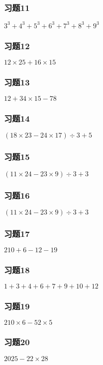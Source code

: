 \begin{frame}
    \frametitle{习题11}
    \centering\textit{\Large $3^3 + 4^3 + 5^3 + 6^3 + 7^3 + 8^3 + 9^3$}
\end{frame}

\begin{frame}
    \frametitle{习题12}
    \centering\textit{\Large $12\times 25 + 16\times 15$}
\end{frame}

\begin{frame}
    \frametitle{习题13}
    \centering\textit{\Large $12 + 34\times 15 -78$}
\end{frame}

\begin{frame}
    \frametitle{习题14}
    \centering\textit{\Large $(18\times 23 - 24\times 17)\div 3 + 5$}
\end{frame}

\begin{frame}
    \frametitle{习题15}
    \centering\textit{\Large $(11\times 24 - 23\times 9)\div 3 + 3$}
\end{frame}

\begin{frame}
    \frametitle{习题16}
    \centering\textit{\Large $(11\times 24 - 23\times 9)\div 3 + 3$}
\end{frame}

\begin{frame}
    \frametitle{习题17}
    \centering\textit{\Large $210 + 6-12 - 19$}
\end{frame}

\begin{frame}
    \frametitle{习题18}
    \centering\textit{\Large $1+3+4+6+7+9+10 + 12$}
\end{frame}

\begin{frame}
    \frametitle{习题19}
    \centering\textit{\Large $210\times 6 - 52\times 5$}
\end{frame}

\begin{frame}
    \frametitle{习题20}
    \centering\textit{\Large $2025- 22\times 28$}
\end{frame}